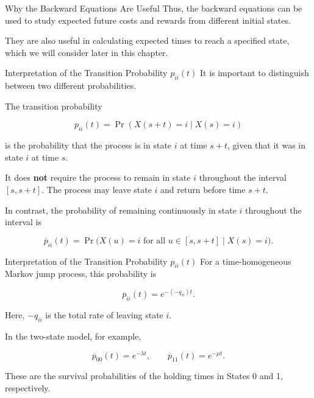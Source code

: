 \documentclass[
  ignorenonframetext,
  aspectratio=169,
]{beamer}
\begin{document}
\begin{frame}{Why the Backward Equations Are Useful}
\protect{}\label{why-the-backward-equations-are-useful-1}
Thus, the backward equations can be used to study expected future costs
and rewards from different initial states.

They are also useful in calculating expected times to reach a specified
state, which we will consider later in this chapter.
\end{frame}

\begin{frame}{Interpretation of the Transition Probability
\(p_{ii}(t)\)}
\protect{}\label{interpretation-of-the-transition-probability-p_iit}
It is important to distinguish between two different probabilities.

The transition probability

\[
p_{ii}(t)
=
\Pr(X(s+t)=i\mid X(s)=i)
\]

is the probability that the process is in state \(i\) at time \(s+t\),
given that it was in state \(i\) at time \(s\).

It does \textbf{not} require the process to remain in state \(i\)
throughout the interval \([s,s+t]\). The process may leave state \(i\)
and return before time \(s+t\).

In contrast, the probability of remaining continuously in state \(i\)
throughout the interval is

\[
\overline p_{ii}(t)
=
\Pr\bigl(X(u)=i\text{ for all }u\in[s,s+t]
\mid X(s)=i\bigr).
\]
\end{frame}

\begin{frame}{Interpretation of the Transition Probability
\(p_{ii}(t)\)}
\protect{}\label{interpretation-of-the-transition-probability-p_iit-1}
For a time-homogeneous Markov jump process, this probability is

\[
\boxed{
\overline p_{ii}(t)=e^{-(-q_{ii})t}.
}
\]

Here, \(-q_{ii}\) is the total rate of leaving state \(i\).

In the two-state model, for example,

\[
\overline p_{00}(t)=e^{-\lambda t},
\qquad
\overline p_{11}(t)=e^{-\mu t}.
\]

These are the survival probabilities of the holding times in States 0
and 1, respectively.
\end{frame}
\end{document}
